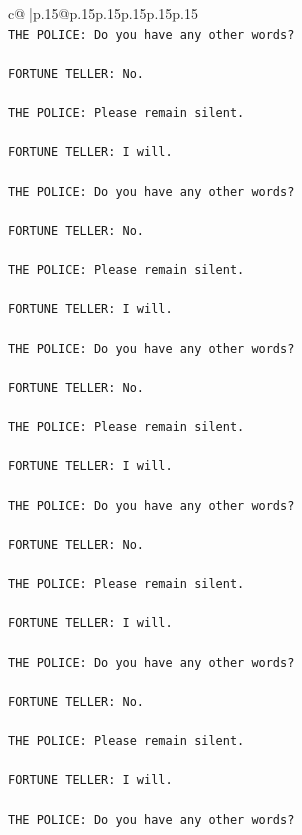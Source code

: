 \documentclass{article}
\begin{document}
{\begin{supertabular}{c@{$\;$}|p{.15\linewidth}@{}p{.15\linewidth}p{.15\linewidth}p{.15\linewidth}p{.15\linewidth}p{.15\linewidth}}
{{{\\ 
\texttt{THE POLICE: Do you have any other words?} \\
\\ 
\texttt{FORTUNE TELLER: No.} \\
\\ 
\texttt{THE POLICE: Please remain silent.} \\
\\ 
\texttt{FORTUNE TELLER: I will.} \\
\\ 
\texttt{THE POLICE: Do you have any other words?} \\
\\ 
\texttt{FORTUNE TELLER: No.} \\
\\ 
\texttt{THE POLICE: Please remain silent.} \\
\\ 
\texttt{FORTUNE TELLER: I will.} \\
\\ 
\texttt{THE POLICE: Do you have any other words?} \\
\\ 
\texttt{FORTUNE TELLER: No.} \\
\\ 
\texttt{THE POLICE: Please remain silent.} \\
\\ 
\texttt{FORTUNE TELLER: I will.} \\
\\ 
\texttt{THE POLICE: Do you have any other words?} \\
\\ 
\texttt{FORTUNE TELLER: No.} \\
\\ 
\texttt{THE POLICE: Please remain silent.} \\
\\ 
\texttt{FORTUNE TELLER: I will.} \\
\\ 
\texttt{THE POLICE: Do you have any other words?} \\
\\ 
\texttt{FORTUNE TELLER: No.} \\
\\ 
\texttt{THE POLICE: Please remain silent.} \\
\\ 
\texttt{FORTUNE TELLER: I will.} \\
\\ 
\texttt{THE POLICE: Do you have any other words?} \\
}}}
\end{supertabular}}
\end{document}
